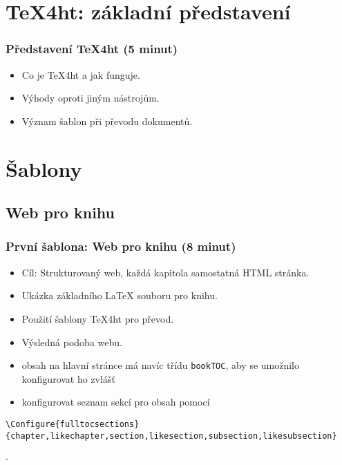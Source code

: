 \documentclass{beamer}
\begin{document}
\section{TeX4ht: základní představení}
\begin{frame}
\frametitle{Představení TeX4ht (5 minut)}
\begin{itemize}
    \item Co je TeX4ht a jak funguje.
    \item Výhody oproti jiným nástrojům.
    \item Význam šablon při převodu dokumentů.
\end{itemize}
\end{frame}

\section{Šablony}

\subsection{Web pro knihu}
\begin{frame}
\frametitle{První šablona: Web pro knihu (8 minut)}
\begin{itemize}
    \item Cíl: Strukturovaný web, každá kapitola samostatná HTML stránka.
    \item Ukázka základního LaTeX souboru pro knihu.
    \item Použití šablony TeX4ht pro převod.
    \item Výsledná podoba webu.
\end{itemize}
\end{frame}

\begin{frame}[fragile]
\begin{itemize}
  \item obsah na hlavní stránce má navíc třídu \verb|bookTOC|, aby se umožnilo konfigurovat ho zvlášť
  \item konfigurovat seznam sekcí pro obsah pomocí 
\end{itemize}
\begin{verbatim}
\Configure{fulltocsections}{chapter,likechapter,section,likesection,subsection,likesubsection}
\end{verbatim}
\end{frame}

- 
\end{document}
